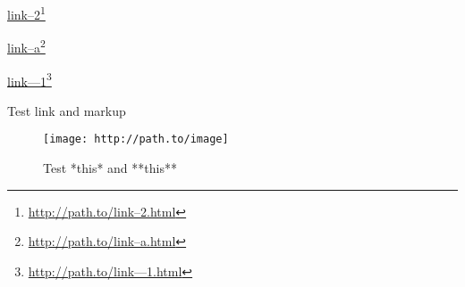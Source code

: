 \href{http://path.to/link--2.html}{link--2}\footnote{\href{http://path.to/link--2.html}{http:\slash \slash path.to\slash link--2.html}}

\href{http://path.to/link--a.html}{link--a}\footnote{\href{http://path.to/link--a.html}{http:\slash \slash path.to\slash link--a.html}}

\href{http://path.to/link---1.html}{link---1}\footnote{\href{http://path.to/link---1.html}{http:\slash \slash path.to\slash link---1.html}}

Test link and markup \begin{figure}[htbp]
\centering
\texttt{[image: http://path.to/image]}
\caption{Test *this* and **this**}
\label{image-attr}
\end{figure}





